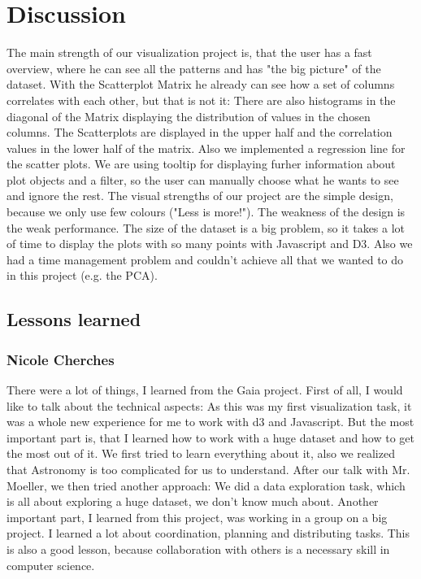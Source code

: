 \documentclass{vgtc}                          %
\begin{document}
\section{Discussion}
The main strength of our visualization project is, that the user has a fast overview, where he can see all the patterns and has "the big picture" of the dataset. With the Scatterplot Matrix he already can see how a set of columns correlates with each other, but that is not it: There are also histograms in the diagonal of the Matrix displaying the distribution of values in the chosen columns. The Scatterplots are displayed in the upper half and the correlation values in the lower half of the matrix. Also we implemented a regression line for the scatter plots. We are using tooltip for displaying furher information about plot objects and a filter, so the user can manually choose what he wants to see and ignore the rest. The visual strengths of our project are the simple design, because we only use few colours ("Less is more!"). 
The weakness of the design is the weak performance. The size of the dataset is a big problem, so it takes a lot of time to display the plots with so many points with Javascript and D3. Also we had a time management problem and couldn't achieve all that we wanted to do in this project (e.g. the PCA). 
\subsection{Lessons learned}
\subsubsection{Nicole Cherches}
There were a lot of things, I learned from the Gaia project. First of all, I would like to talk about the technical aspects: As this was my first visualization task, it was a whole new experience for me to work with d3 and Javascript. But the most important part is, that I learned how to work with a huge dataset and how to get the most out of it. We first tried to learn everything about it, also we realized that Astronomy is too complicated for us to understand. After our talk with Mr. Moeller, we then tried another approach: We did a data exploration task, which is all about exploring a huge dataset, we don't know much about.  
Another important part, I learned from this project, was working in a group on a big project. I learned a lot about coordination, planning and distributing tasks. This is also a good lesson, because collaboration with others is a necessary skill in computer science.
\end{document}
